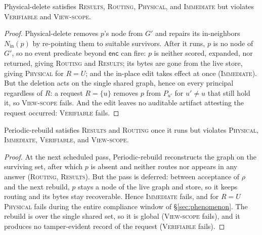 \documentclass[sigconf, nonacm, review]{acmart}
\newcommand{\Nin}{N_{\mathrm{in}}}
\begin{document}
\begin{lemma}
\label{lem:physdelete}
Physical-delete satisfies \textsc{Results}, \textsc{Routing}, \textsc{Physical},
and \textsc{Immediate} but violates \textsc{Verifiable} and \textsc{View-scope}.
\end{lemma}
\begin{proof}
Physical-delete removes $p$'s node from $G'$ and repairs its in-neighbors
$\Nin(p)$ by re-pointing them to suitable survivors. After it runs, $p$ is no
node of $G'$, so no event predicate beyond $\mathsf{enc}$ can fire: $p$ is
neither scored, expanded, nor returned, giving \textsc{Routing} and
\textsc{Results}; its bytes are gone from the live store, giving
\textsc{Physical} for $R=U$; and the in-place edit takes effect at once
(\textsc{Immediate}). But the deletion acts on the single shared graph, hence
on every principal regardless of $R$: a request $R=\{u\}$ removes $p$ from
$P_{u'}$ for $u'\neq u$ that still hold it, so \textsc{View-scope} fails. And
the edit leaves no auditable artifact attesting the request occurred:
\textsc{Verifiable} fails.
\end{proof}

\begin{lemma}
\label{lem:rebuild}
Periodic-rebuild satisfies \textsc{Results} and \textsc{Routing} once it runs
but violates \textsc{Physical}, \textsc{Immediate}, \textsc{Verifiable}, and
\textsc{View-scope}.
\end{lemma}
\begin{proof}
At the next scheduled pass, Periodic-rebuild reconstructs the graph on the
surviving set, after which $p$ is absent and neither routes nor appears in any
answer (\textsc{Routing}, \textsc{Results}). But the pass is deferred: between
acceptance of $\rho$ and the next rebuild, $p$ stays a node of the live graph
and store, so it keeps routing and its bytes stay recoverable. Hence
\textsc{Immediate} fails, and for $R=U$ \textsc{Physical} fails during the
entire compliance window of \S\ref{sec:phenomenon}. The rebuild is over the
single shared set, so it is global (\textsc{View-scope} fails), and it
produces no tamper-evident record of the request (\textsc{Verifiable} fails).
\end{proof}
\end{document}
